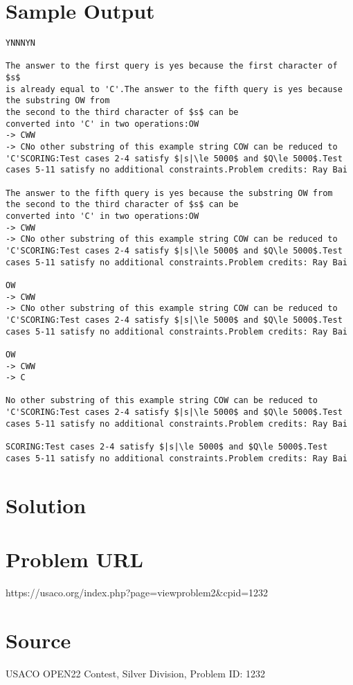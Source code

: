 \documentclass[12pt]{article}
\begin{document}
\section*{Sample Output}
\begin{verbatim}
YNNNYN

The answer to the first query is yes because the first character of $s$
is already equal to 'C'.The answer to the fifth query is yes because the substring OW from 
the second to the third character of $s$ can be
converted into 'C' in two operations:OW
-> CWW
-> CNo other substring of this example string COW can be reduced to 'C'SCORING:Test cases 2-4 satisfy $|s|\le 5000$ and $Q\le 5000$.Test cases 5-11 satisfy no additional constraints.Problem credits: Ray Bai

The answer to the fifth query is yes because the substring OW from 
the second to the third character of $s$ can be
converted into 'C' in two operations:OW
-> CWW
-> CNo other substring of this example string COW can be reduced to 'C'SCORING:Test cases 2-4 satisfy $|s|\le 5000$ and $Q\le 5000$.Test cases 5-11 satisfy no additional constraints.Problem credits: Ray Bai

OW
-> CWW
-> CNo other substring of this example string COW can be reduced to 'C'SCORING:Test cases 2-4 satisfy $|s|\le 5000$ and $Q\le 5000$.Test cases 5-11 satisfy no additional constraints.Problem credits: Ray Bai

OW
-> CWW
-> C

No other substring of this example string COW can be reduced to 'C'SCORING:Test cases 2-4 satisfy $|s|\le 5000$ and $Q\le 5000$.Test cases 5-11 satisfy no additional constraints.Problem credits: Ray Bai

SCORING:Test cases 2-4 satisfy $|s|\le 5000$ and $Q\le 5000$.Test cases 5-11 satisfy no additional constraints.Problem credits: Ray Bai
\end{verbatim}

\section*{Solution}


\section*{Problem URL}
https://usaco.org/index.php?page=viewproblem2&cpid=1232

\section*{Source}
USACO OPEN22 Contest, Silver Division, Problem ID: 1232
\end{document}
